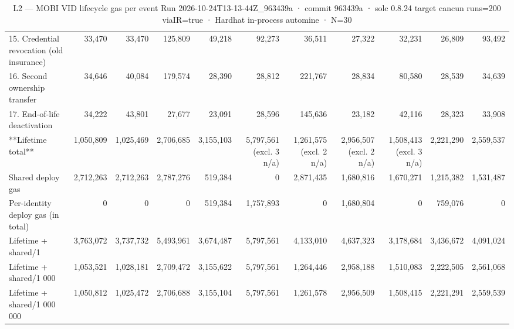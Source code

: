 \begin{table}[ht]
\begin{tabular}{lrrrrrrrrrr}
15. Credential revocation (old insurance) & 33,470 & 33,470 & 125,809 & 49,218 & 92,273 & 36,511 & 27,322 & 32,231 & 26,809 & 93,492 \\
16. Second ownership transfer & 34,646 & 40,084 & 179,574 & 28,390 & 28,812 & 221,767 & 28,834 & 80,580 & 28,539 & 34,639 \\
17. End-of-life deactivation & 34,222 & 43,801 & 27,677 & 23,091 & 28,596 & 145,636 & 23,182 & 42,116 & 28,323 & 33,908 \\
**Lifetime total** & 1,050,809 & 1,025,469 & 2,706,685 & 3,155,103 & 5,797,561 (excl. 3 n/a) & 1,261,575 (excl. 2 n/a) & 2,956,507 (excl. 2 n/a) & 1,508,413 (excl. 3 n/a) & 2,221,290 & 2,559,537 \\
Shared deploy gas & 2,712,263 & 2,712,263 & 2,787,276 & 519,384 & 0 & 2,871,435 & 1,680,816 & 1,670,271 & 1,215,382 & 1,531,487 \\
Per-identity deploy gas (in total) & 0 & 0 & 0 & 519,384 & 1,757,893 & 0 & 1,680,804 & 0 & 759,076 & 0 \\
Lifetime + shared/1 & 3,763,072 & 3,737,732 & 5,493,961 & 3,674,487 & 5,797,561 & 4,133,010 & 4,637,323 & 3,178,684 & 3,436,672 & 4,091,024 \\
Lifetime + shared/1 000 & 1,053,521 & 1,028,181 & 2,709,472 & 3,155,622 & 5,797,561 & 1,264,446 & 2,958,188 & 1,510,083 & 2,222,505 & 2,561,068 \\
Lifetime + shared/1 000 000 & 1,050,812 & 1,025,472 & 2,706,688 & 3,155,104 & 5,797,561 & 1,261,578 & 2,956,509 & 1,508,415 & 2,221,291 & 2,559,539 \\
\bottomrule
\end{tabular}
\caption{L2 — MOBI VID lifecycle gas per event Run 2026-10-24T13-13-44Z\_963439a · commit 963439a · solc 0.8.24 target cancun runs=200 viaIR=true · Hardhat in-process automine · N=30}
\label{tab:lifecycle_gas}
\end{table}
